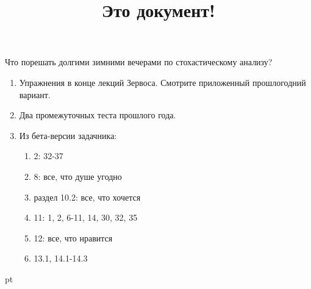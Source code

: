 \documentclass[pdftex,12pt,a4paper]{article}
\title{Это документ!}
\begin{document}
Что порешать долгими зимними вечерами по стохастическому анализу?
\begin{enumerate}
\item Упражнения в конце лекций Зервоса. Смотрите приложенный прошлогодний вариант.
\item Два промежуточных теста прошлого года.
\item Из бета-версии задачника:
\begin{enumerate}
\item 2: 32-37
\item 8: все, что душе угодно
\item раздел 10.2: все, что хочется
\item 11: 1, 2, 6-11, 14, 30, 32, 35
\item 12: все, что нравится
\item 13.1, 14.1-14.3
\end{enumerate}
\end{enumerate}


 pt %
\end{document}
